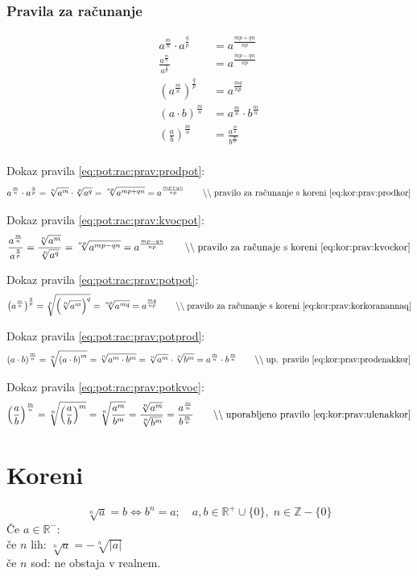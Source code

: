 \documentclass[a4paper,oneside,12pt,fleqn]{article}
\def\R{\ensuremath{\mathbb R}}
\def\Z{\ensuremath{\mathbb Z}}
\newcommand\krat\cdot
\newcommand{\comment}[1]{\ensuremath{\qquad\backslash\backslash\;}\textnormal{#1}}
\renewcommand\iff\Leftrightarrow
\numberwithin{equation}{section}
\begin{document}
\subsubsection{Pravila za računanje}
\label{sec:pot:rac:prav}
\begin{align}
  a^{\frac{m}{n}} \krat a^{\frac{q}{p}} &= a^{\frac{mp+qn}{np}} \label{eq:pot:rac:prav:prodpot} \\
  \frac{a^{\frac{m}{n}}}{a^{\frac{q}{p}}} &= a^{\frac{mp-qn}{np}} \label{eq:pot:rac:prav:kvocpot} \\
  \left( a^{\frac{m}{n}} \right)^{\frac{q}{p}} &= a^{\frac{mq}{np}} \label{eq:pot:rac:prav:potpot} \\
  \left( a \krat b \right)^{\frac{m}{n}} &= a^{\frac{m}{n}} \krat b^{\frac{m}{n}}
  \label{eq:pot:rac:prav:potprod} \\
  \left( \frac{a}{b} \right)^{\frac{m}{n}} &= \frac{a^{\frac{m}{n}}}{b^{\frac{m}{n}}}
  \label{eq:pot:rac:prav:potkvoc} \\
\end{align}

Dokaz pravila \ref{eq:pot:rac:prav:prodpot}:
\[ a^{\frac{m}{n}} \krat a^{\frac{q}{p}} = \sqrt[n]{a^m} \krat \sqrt[p]{a^q} =
\sqrt[np]{a^{mp+qn}} = a^{\frac{mp+qn}{np}} \comment{pravilo za računanje s
koreni \eqref{eq:kor:prav:prodkor}} \]

Dokaz pravila \ref{eq:pot:rac:prav:kvocpot}:
\[ \frac{a^{\frac{m}{n}}}{a^{\frac{q}{p}}} = \frac{\sqrt[n]{a^m}}{\sqrt[p]{a^q}} =
\sqrt[np]{a^{mp-qn}} = a^{\frac{mp-qn}{np}} \comment{pravilo za računaje s koreni
\eqref{eq:kor:prav:kvockor}} \]

Dokaz pravila \ref{eq:pot:rac:prav:potpot}:
\[ \left( a^{\frac{m}{n}} \right)^{\frac{q}{p}} = \sqrt[p]{\left(\sqrt[n]{a^m} \right)^q}
= \sqrt[np]{a^{mq}} = a^{\frac{mq}{np}} \comment{pravilo za računanje s koreni
\eqref{eq:kor:prav:korkoranannaq}}\]

Dokaz pravila \ref{eq:pot:rac:prav:potprod}:
\[ \left( a \krat b \right)^{\frac{m}{n}} = \sqrt[n]{\left( a \krat b\right)^m} =
\sqrt[n]{a^m \krat b^m} = \sqrt[n]{a^m} \krat \sqrt[n]{b^m} = a^{\frac{m}{n}} \krat
b^{\frac{m}{n}} \comment{up. pravilo \eqref{eq:kor:prav:prodenakkor}} \]

Dokaz pravila \ref{eq:pot:rac:prav:potkvoc}:
\[ \left( \frac{a}{b} \right)^{\frac{m}{n}} = \sqrt[n]{\left( \frac{a}{b} \right)^m} =
\sqrt[n]{\frac{a^m}{b^m}} = \frac{\sqrt[n]{a^m}}{\sqrt[n]{b^m}} =
\frac{a^{\frac{m}{n}}}{b^{\frac{m}{n}}} \comment{uporabljeno pravilo \eqref{eq:kor:prav:ulenakkor}}
\]
\section{Koreni}
\label{sec:kor}
\begin{equation}
  \label{eq:kor:def}
  \sqrt[n]{a} = b \iff b^n = a; \quad a, b \in \R^+ \cup \{0\}, \; n \in \Z - \{0\}
\end{equation}
Če $a \in \R^-$: \\
če $n$ lih: $\sqrt[n]{a} = -\sqrt[n]{|a|}$ \\
če $n$ sod: ne obstaja v realnem.\\
\end{document}
